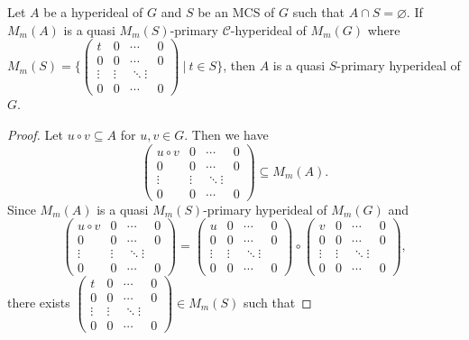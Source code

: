 \documentclass[10pt,a4paper]{amsart}
\begin{document}
\begin{theorem}
Let $A$ be a   hyperideal of $G$ and $S$ be an MCS of $G$ such that $A \cap S=\varnothing$. If $M_m(A)$ is a quasi $M_m(S)$-primary  $\mathcal{C}$-hyperideal of $M_m(G)$ where $M_m(S)=\{\begin{pmatrix}
t & 0 & \cdots & 0 \\
0 & 0 & \cdots & 0 \\
\vdots & \vdots & \ddots \vdots \\
0 & 0 & \cdots & 0 
\end{pmatrix} \ \vert \ t \in S\}$, then $A$ is a quasi $S$-primary hyperideal of $G$. 
\end{theorem}

\begin{proof}
Let $u \circ v \subseteq A$ for $u,v \in G$. Then we have
\[\begin{pmatrix}
u \circ v & 0 & \cdots & 0 \\
0 & 0 & \cdots & 0 \\
\vdots & \vdots & \ddots \vdots \\
0 & 0 & \cdots & 0 
\end{pmatrix}
\subseteq M_m(A).\]
Since $M_m(A)$ is a quasi $M_m(S)$-primary   hyperideal of $M_m(G)$ and 
\[ \begin{pmatrix}
u \circ v & 0 & \cdots & 0\\
0 & 0 & \cdots & 0\\
\vdots & \vdots & \ddots \vdots\\
0 & 0 & \cdots & 0
\end{pmatrix}
=
\begin{pmatrix}
u & 0 & \cdots & 0\\
0 & 0 & \cdots & 0\\
\vdots & \vdots & \ddots \vdots\\
0 & 0 & \cdots & 0
\end{pmatrix}
\circ  
\begin{pmatrix}
v & 0 & \cdots & 0\\
0 & 0 & \cdots & 0\\
\vdots & \vdots & \ddots \vdots\\
0 & 0 & \cdots & 0
\end{pmatrix},
\]
there exists $\begin{pmatrix}
t & 0 & \cdots & 0 \\
0 & 0 & \cdots & 0 \\
\vdots & \vdots & \ddots \vdots \\
0 & 0 & \cdots & 0 
\end{pmatrix} \in M_m(S)$ such that  

\end{proof}
\end{document}
